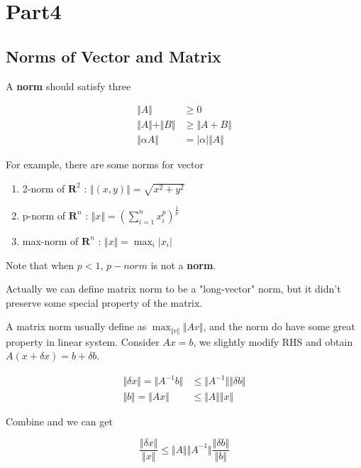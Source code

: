 \section{Part4}

\subsection{Norms of Vector and Matrix}

A \textbf{norm} should satisfy three

\begin{align}
    \Vert A \Vert &\geq 0 \nonumber \\
    \Vert A \Vert + \Vert B \Vert &\geq \Vert A+B \Vert \nonumber \\
    \Vert \alpha A \Vert &= |\alpha| \Vert A \Vert \nonumber
\end{align}

For example, there are some norms for vector
\begin{enumerate}
  \item 2-norm of $\mathbf{R} ^ 2$ :
    $\Vert (x, y) \Vert = \sqrt{x^2 + y^2}$
  \item p-norm of $\mathbf{R} ^ n$ :
    $\Vert x \Vert = \left( \sum_{i=1}^{n} x_i^p \right)^\frac{1}{p}$
  \item max-norm of $\mathbf{R} ^ n$ :
    $\Vert x \Vert = \max_i |x_i|$ 
\end{enumerate}

Note that when $p < 1$, $p-norm$ is not a \textbf{norm}.

Actually we can define matrix norm to be a "long-vector" norm,
but it didn't preserve some special property of the matrix.

A matrix norm usually define as $\max_{\Vert v\Vert} \Vert Av \Vert$,
and the norm do have some great property in linear system.
Consider $Ax = b$, we slightly modify RHS and obtain
$A(x + \delta x) = b + \delta b$.

\begin{align}
    \Vert \delta x\Vert = \Vert A^{-1}b \Vert &\leq \Vert A^{-1} \Vert \Vert \delta b \Vert \nonumber \\
    \Vert b\Vert = \Vert Ax \Vert &\leq \Vert A \Vert \Vert x \Vert \nonumber
\end{align}

Combine and we can get

\[
  \frac{\Vert \delta x \Vert}{\Vert x \Vert} \leq \Vert A \Vert \Vert A^{-1} \Vert
                                                  \frac{\Vert \delta b \Vert}{\Vert b\Vert}
\]

